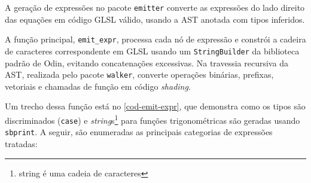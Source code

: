A geração de expressões no pacote \texttt{emitter} converte as expressões do lado direito das equações em código GLSL válido, usando a AST anotada com tipos inferidos.

A função principal, \verb"emit_expr", processa cada nó de expressão e constrói a cadeira de caracteres correspondente em GLSL usando um \verb"StringBuilder" da biblioteca padrão de Odin, evitando concatenações excessivas. Na travessia recursiva da AST, realizada pelo pacote \texttt{walker}, converte operações binárias, prefixas, vetoriais e chamadas de função em código \textit{shading}.

Um trecho dessa função está no \autoref{cod-emit-expr}, que demonstra como os tipos são discriminados (\texttt{case}) e \textit{string}s\footnote{string é uma cadeia de caracteres} para funções trigonométricas são geradas usando \verb|sbprint|. A seguir, são enumeradas as principais categorias de expressões tratadas:

